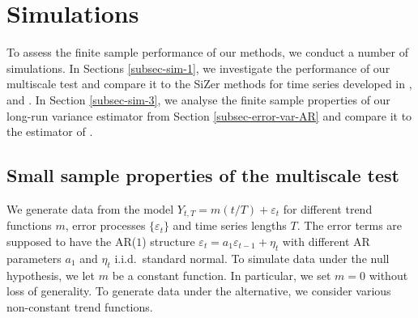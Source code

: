 
\section{Simulations}\label{sec-sim}


To assess the finite sample performance of our methods, we conduct a number of simulations. In Sections \ref{subsec-sim-1}, we investigate the performance of our multiscale test and compare it to the SiZer methods for time series developed in \cite{Rondonotti2004}, \cite{Rondonotti2007} and \cite{ParkHannigKang2009}. In Section \ref{subsec-sim-3}, we analyse the finite sample properties of our long-run variance estimator from Section \ref{subsec-error-var-AR} and compare it to the estimator of \cite{Hall2003}. 


\subsection{Small sample properties of the multiscale test}


We generate data from the model $Y_{t,T} = m(t/T) + \varepsilon_t$ for different trend functions $m$, error processes $\{\varepsilon_t\}$ and time series lengths $T$. The error terms are supposed to have the AR($1$) structure $\varepsilon_t = a_1 \varepsilon_{t-1} + \eta_t$ with different AR parameters $a_1$ and $\eta_t$ i.i.d.\ standard normal. To simulate data under the null hypothesis, we let $m$ be a constant function. In particular, we set $m = 0$ without loss of generality. To generate data under the alternative, we consider various non-constant trend functions.
 

